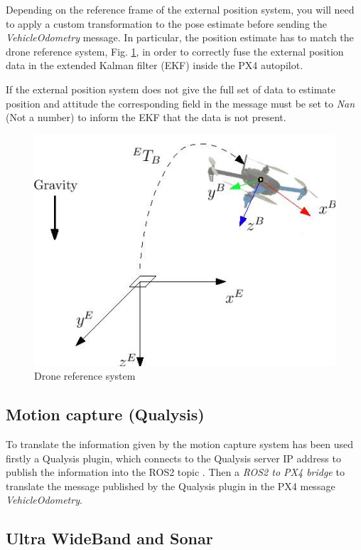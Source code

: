 \documentclass[journal]{IEEEtran}
\begin{document}
Depending on the reference frame of the external position system, you will need to apply a custom transformation to the pose estimate before sending the \textit{VehicleOdometry} message. In particular, the position estimate has to match the drone reference system, Fig. \ref{fig:ref_frames}, in order to correctly fuse the external position data in the extended Kalman filter (EKF) inside the PX4 autopilot.

If the external position system does not give the full set of data to estimate position and attitude the corresponding field in the message must be set to \textit{Nan} (Not a number) to inform the EKF that the data is not present.

\begin{figure}
    \centering
    \includegraphics[scale=0.4]{Images/ref_frames.png}
    \caption{Drone reference system}
    \label{fig:ref_frames}
\end{figure}

\subsection{Motion capture (Qualysis)}

To translate the information given by the motion capture system has been used firstly a Qualysis plugin, which connects to the Qualysis server IP address to publish the information into the ROS2 topic \cite{qualisys_ros2}. Then a \textit{ROS2 to PX4 bridge} to translate the message published by the Qualysis plugin in the PX4 message \textit{VehicleOdometry}.

\subsection{Ultra WideBand and Sonar}
\end{document}
